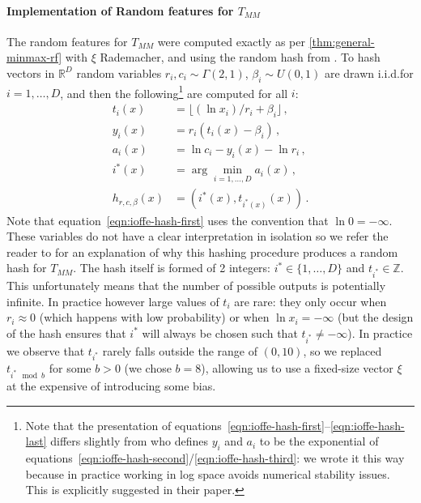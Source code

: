 \documentclass{article}
\theoremstyle{plain}
\theoremstyle{definition}
\theoremstyle{remark}
\begin{document}
\paragraph{Implementation of Random features for $T_{MM}$}
The random features for $T_{MM}$ were computed exactly as per \cref{thm:general-minmax-rf} with $\xi$ Rademacher,
and using the random hash from \citet{ioffe2010improved}.
To hash vectors in $\mathbb{R}^D$
random variables
$r_i, c_i\sim \Gamma(2, 1)$, $\beta_i\sim U(0, 1)$
are drawn i.i.d.\@ for $i=1,\ldots,D$,
and then the following\footnote{
Note that the presentation of equations~\ref{eqn:ioffe-hash-first}--\ref{eqn:ioffe-hash-last}
differs slightly from \citet{ioffe2010improved} who defines $y_i$ and $a_i$ to be the exponential
of equations~\ref{eqn:ioffe-hash-second}/\ref{eqn:ioffe-hash-third}: we wrote it this way because in practice
working in log space avoids numerical stability issues.
This is explicitly suggested in their paper.
}
are computed for all $i$:
\begin{align}
    t_i(x) &= \lfloor (\ln{x_i})/r_i + \beta_i \rfloor \label{eqn:ioffe-hash-first}\,, \\
    y_i(x) &= r_i(t_i(x)-\beta_i) \label{eqn:ioffe-hash-second}\,, \\
    a_i(x) &= \ln{c_i} - y_i(x) - \ln{r_i} \label{eqn:ioffe-hash-third}\,, \\
    i^*(x) &= \arg\min_{i=1,\ldots,D} a_i(x)\,,  \\
    h_{r,c,\beta}(x) &= \left(i^*(x), t_{i^*(x)}(x)\right) \,.\label{eqn:ioffe-hash-last}
\end{align}
Note that equation~\ref{eqn:ioffe-hash-first} uses the convention that $\ln{0}=-\infty$.
These variables do not have a clear interpretation in isolation so we refer the reader
to \citet{ioffe2010improved} for an explanation of why this hashing procedure
produces a random hash for $T_{MM}$.
The hash itself is formed of 2 integers: $i^*\in\{1,\ldots,D\}$
and $t_{i^*}\in\mathbb{Z}$.
This unfortunately means that the number of possible outputs is potentially infinite.
In practice however large values of $t_i$ are rare: they only occur when $r_i\approx 0$ (which happens with low probability)
or when $\ln{x_i}=-\infty$ (but the design of the hash ensures that $i^*$  will always be chosen such that $t_{i^*}\neq-\infty$).
In practice we observe that $t_{i^*}$ rarely falls outside the range of $(0,10)$,
so we replaced $t_{i^*\mod{b}}$ for some $b>0$ (we chose $b=8$),
allowing us to use a fixed-size vector $\xi$ at the expensive of introducing some bias.
\end{document}
